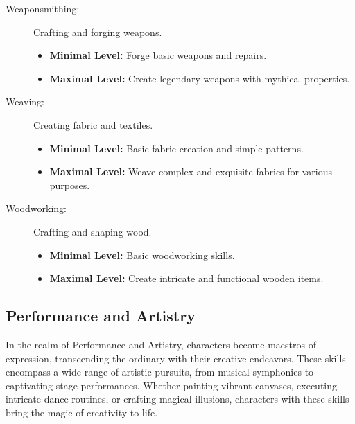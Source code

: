 \documentclass[12pt]{book}  %
\begin{document}
\begin{description}
    \item[Weaponsmithing:] Crafting and forging weapons.
        \begin{itemize}
            \item \textbf{Minimal Level:} Forge basic weapons and repairs.
            \item \textbf{Maximal Level:} Create legendary weapons with mythical properties.
        \end{itemize}

    \item[Weaving:] Creating fabric and textiles.
        \begin{itemize}
            \item \textbf{Minimal Level:} Basic fabric creation and simple patterns.
            \item \textbf{Maximal Level:} Weave complex and exquisite fabrics for various purposes.
        \end{itemize}

    \item[Woodworking:] Crafting and shaping wood.
        \begin{itemize}
            \item \textbf{Minimal Level:} Basic woodworking skills.
            \item \textbf{Maximal Level:} Create intricate and functional wooden items.
        \end{itemize}

\end{description}

\subsection{\textbf{Performance and Artistry}}

In the realm of Performance and Artistry, characters become maestros of expression, transcending the ordinary with their creative endeavors. These skills encompass a wide range of artistic pursuits, from musical symphonies to captivating stage performances. Whether painting vibrant canvases, executing intricate dance routines, or crafting magical illusions, characters with these skills bring the magic of creativity to life.
\end{document}

